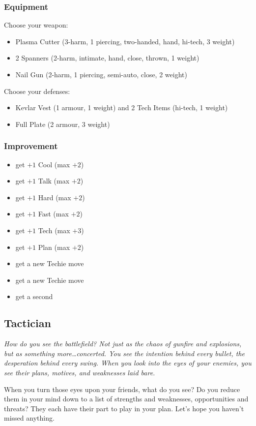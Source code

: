 \subsubsection{Equipment}
Choose your weapon:
\begin{itemize}
\item Plasma Cutter (3-harm, 1 piercing, two-handed, hand, hi-tech, 3 weight)
\item 2 Spanners (2-harm, intimate, hand, close, thrown, 1 weight)
\item Nail Gun (2-harm, 1 piercing, semi-auto, close, 2 weight)
\end{itemize}

Choose your defenses:
\begin{itemize}
\item Kevlar Vest (1 armour, 1 weight) and 2 Tech Items (hi-tech, 1 weight)
\item Full Plate (2 armour, 3 weight)
\end{itemize}

\subsubsection{Improvement}
\begin{itemize}
\item get $+1$ Cool (max $+2$)
\item get $+1$ Talk (max $+2$)
\item get $+1$ Hard (max $+2$)
\item get $+1$ Fast (max $+2$)
\item get $+1$ Tech (max $+3$)
\item get $+1$ Plan (max $+2$)
\item get a new Techie move
\item get a new Techie move
\item get a second 
\end{itemize}



\subsection{Tactician}
{\itshape How do you see the battlefield? Not just as the chaos of
  gunfire and explosions, but as something more\ldots concerted. You
  see the intention behind every bullet, the desperation behind every
  swing. When you look into the eyes of your enemies, you see their
  plans, motives, and weaknesses laid bare.

When you turn those eyes upon your friends, what do you see? Do you
reduce them in your mind down to a list of strengths and weaknesses,
opportunities and threats? They each have their part to play in your
plan. Let's hope you haven't missed anything.}
